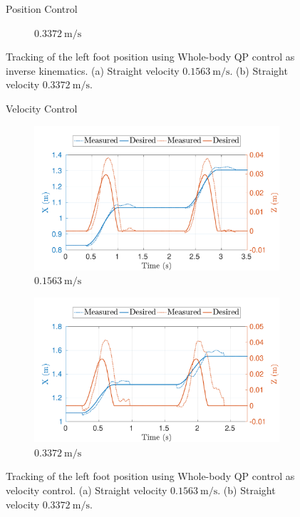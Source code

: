\begin{figure}[t]
\begin{myframe}{Position Control}
\begin{subfigure}[t]{0.49\columnwidth}
            \caption{$\SI{0.3372}{\meter \per \second}$}
            \label{fig:inst_pos-max_vel-lf}
            \end{subfigure}
        \end{myframe}
             \caption{Tracking of the left foot position using Whole-body QP control as inverse kinematics. (a) Straight velocity $\SI{0.1563}{\meter \per \second}$. (b) Straight velocity $\SI{0.3372}{\meter \per \second}$.}
    \end{figure}
    
\begin{figure}[t]
    \begin{myframe}{Velocity Control}
        \begin{subfigure}[t]{0.49\columnwidth}
        \centering
        \includegraphics[width=\textwidth]{chapter_wbc_benchmarking/figures/inst_vel-min_vel-lf.pdf}
        \caption{$\SI{0.1563}{\meter \per \second}$}
        \label{fig:inst_vel-min_vel-lf}
    \end{subfigure}
    \begin{subfigure}[t]{0.49\columnwidth}
        \centering
        \includegraphics[width=\textwidth]{chapter_wbc_benchmarking/figures/inst_vel-max_vel-lf.pdf}
        \caption{$\SI{0.3372}{\meter \per \second}$}
        \label{fig:inst_vel-max_vel-lf}
    \end{subfigure}
    \end{myframe}
     \caption{Tracking of the left foot position using Whole-body QP  control as velocity control. (a) Straight velocity $\SI{0.1563}{\meter \per \second}$. (b) Straight velocity $\SI{0.3372}{\meter \per \second}$.}
\end{figure}

